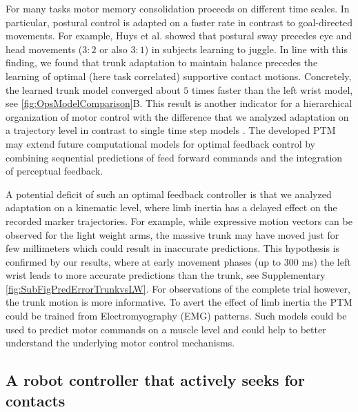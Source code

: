For many tasks motor memory consolidation proceeds on 
different time scales\cite{wolpert2000computational, 
smith2006interacting, diedrichsen2010coordination}. In particular, postural 
control is adapted on a faster rate in contrast to goal-directed movements. For 
example, Huys et al. showed that postural sway precedes eye and head movements 
($3:2$ or also $3:1$) in subjects learning to juggle\cite{huys2004timescales}. 
In line with this finding, we found that trunk adaptation to maintain balance 
precedes the learning of optimal (here task correlated) supportive contact 
motions. Concretely, the learned trunk model converged about $5$ times faster 
than the left wrist model, see \FigureAbbr \ref{fig:OpsModelComparison}B. This result is 
another indicator for a hierarchical organization of motor control with the 
difference that we analyzed adaptation on a trajectory level in contrast to 
single time step models \cite{kuo1995optimal, wolpert2000computational, 
diedrichsen2010coordination}. The developed PTM  may extend future computational 
models for optimal feedback control by combining sequential predictions of feed 
forward commands and the integration of perceptual feedback. 

A potential deficit of such an optimal feedback controller is that we analyzed 
adaptation on a kinematic level, where limb inertia has a delayed effect on the 
recorded marker trajectories. For example, while expressive motion vectors can 
be observed for the light weight arms, the massive trunk may have moved just for 
few millimeters which could result in inaccurate predictions. This hypothesis is 
confirmed by our results, where at early movement phases (up to $300$ ms) the 
left wrist leads to more accurate predictions than the trunk, see Supplementary 
\FigureAbbr \ref{fig:SubFigPredErrorTrunkvsLW}. For observations of the complete 
trial however, the trunk motion is more informative. To avert the effect of limb 
inertia the PTM could be trained from Electromyography (EMG) patterns. Such 
models could be used to predict motor commands on a muscle level and could help to 
better understand the underlying motor control mechanisms. 

\subsection{A robot controller that actively seeks for contacts}

